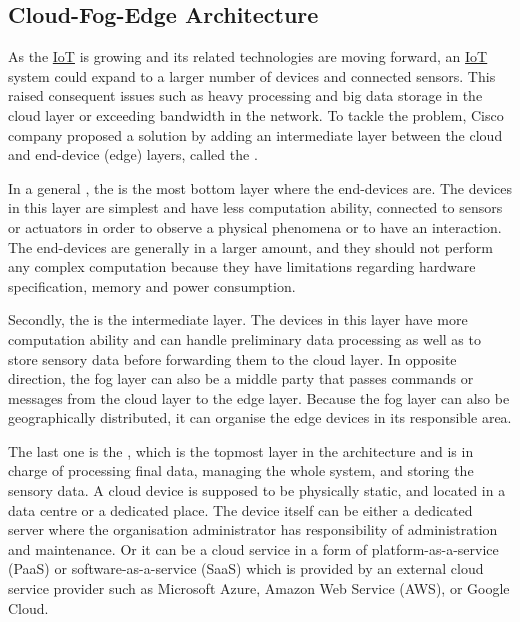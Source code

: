 \subsection{Cloud-Fog-Edge Architecture} \label{Background-IoT-CloudFogEdge}

\npara As the \hyperref[Acronym-IoT]{IoT} is growing and its related technologies are moving forward, an \hyperref[Acronym-IoT]{IoT} system could expand to a larger number of devices and connected sensors.
This raised consequent issues such as heavy processing and big data storage in the cloud layer or exceeding bandwidth in the network.
To tackle the problem, Cisco company proposed a solution by adding an intermediate layer between the cloud and end-device (edge) layers, called the  \citep{CiscoUnleashFog}.

In a general , the  is the most bottom layer where the end-devices are.
The devices in this layer are simplest and have less computation ability, connected to sensors or actuators in order to observe a physical phenomena or to have an interaction.
The end-devices are generally in a larger amount, and they should not perform any complex computation because they have limitations regarding hardware specification, memory and power consumption.

\npara Secondly, the  is the intermediate layer.
The devices in this layer have more computation ability and can handle preliminary data processing as well as to store sensory data before forwarding them to the cloud layer.
In opposite direction, the fog layer can also be a middle party that passes commands or messages from the cloud layer to the edge layer.
Because the fog layer can also be geographically distributed, it can organise the edge devices in its responsible area.

\npara The last one is the , which is the topmost layer in the architecture and is in charge of processing final data, managing the whole system, and storing the sensory data.
A cloud device is supposed to be physically static, and located in a data centre or a dedicated place.
The device itself can be either a dedicated server where the organisation administrator has responsibility of administration and maintenance.
Or it can be a cloud service in a form of platform-as-a-service (PaaS) or software-as-a-service (SaaS) which is provided by an external cloud service provider such as Microsoft Azure, Amazon Web Service (AWS), or Google Cloud.

